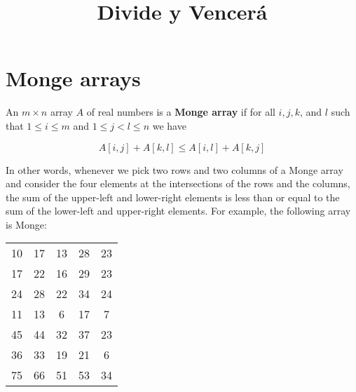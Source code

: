 \documentclass{article}
\begin{document}

\title{Divide y Vencerá}
\date{}
\maketitle
\setcounter{section}{0}


\section{Monge arrays}
An $m \times n$ array $A$ of real numbers is a \textbf{Monge array} if for all $i, j, k$, and $l$ such that $1 \leq i \leq m$ and $1 \leq  j < l \leq n$ we have

$$
A[i, j] + A[k, l] \leq A[i, l] + A[k, j]
$$

In other words, whenever we pick two rows and two columns of a Monge array and consider the four elements at the intersections of the rows and the columns, the sum of the upper-left and lower-right elements is less than or equal to the sum of the lower-left and upper-right elements. For example, the following array is Monge:

\begin{tabular}{ccccc}
10 & 17 & 13 & 28 & 23\\
17 & 22 & 16 & 29 & 23\\
24 & 28 & 22 & 34 & 24\\
11 & 13 &  6 & 17 & 7\\
45 & 44 & 32 & 37 & 23\\
36 & 33 & 19 & 21 & 6\\
75 & 66 & 51 & 53 & 34
\end{tabular}
\end{document}
